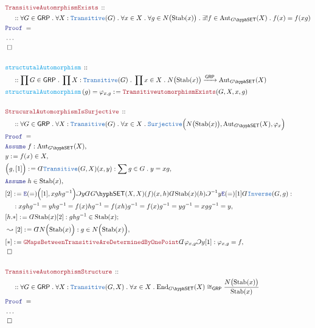 \documentclass[12pt]{scrartcl}
\newcommand{\TYPE}[1]{\textcolor{NavyBlue}{\mathtt{#1}}}
\newcommand{\FUNC}[1]{\textcolor{Cerulean}{\mathtt{#1}}}
\newcommand{\LOGIC}[1]{\textcolor{Blue}{\mathtt{#1}}}
\newcommand{\THM}[1]{\textcolor{Maroon}{\mathtt{#1}}}
\renewcommand{\.}{\; . \;}
\newcommand{\de}{: \kern 0.1pc =}
\newcommand{\Act}[1]{\left( #1 \right)}
\newcommand{\Theorem}[2]{& \THM{#1} \, :: \, #2 \\ & \Proof = \\ }
\newcommand{\DeclareFunc}[2]{& \FUNC{#1} \, :: \, #2 \\}
\newcommand{\DefineNamedFunc}[4]{&  \FUNC{#1}\Act{#2} = #3 \de #4 \\}
\newcommand{\NewLine}{\\ & \kern 1pc}
\newcommand{\Page}[1]{ \begin{align*} #1 \end{align*}   }
\newcommand{ \bd }{ \ByDef }
\newcommand{\NoProof}{ & \ldots \\ \EndProof}
\newcommand{\Elim}{\LOGIC{E}}
\newcommand{\End}{\mathrm{End}}
\newcommand{\Aut}{\mathrm{Aut}}
\newcommand{\Arrow}{\xrightarrow}
\newcommand{\Say}[3]{& #1 \de #2 : #3, \\}
\newcommand{\SayIn}[3]{& #1 \de #2 \in #3, \\}
\newcommand{\Conclude}[3]{& #1 \de #2 : #3; \\}
\newcommand{\Derive}[3]{& \leadsto #1 \de #2 : #3, \\}
\newcommand{\Assume}[2]{& \LOGIC{Assume} \; #1 : #2, \\}
\newcommand{\AssumeIn}[2]{& \LOGIC{Assume} \; #1 \in #2, \\}
\newcommand{\QED}{\; \square}
\newcommand{\EndProof}{& \QED \\}
\newcommand{\ByDef}{\rotatebox[origin=c]{-180}{$D$}}%
\newcommand{\ByConstr}{\rotatebox[origin=c]{-180}{$C$}}%
\newcommand{\Proof}{\LOGIC{Proof} \; }
\newcommand{\SET}{\mathsf{SET}}
\newcommand{\Stab}{\mathrm{Stab}}
\newcommand{\GRP}{\mathsf{GRP}}
\begin{document}
\Page{
	\Theorem{TransitiveAutomrphismExists}
	{
		\NewLine ::
		\forall G \in \GRP \. 
		\forall X : \TYPE{Transitive}(G) \.
		\forall x \in X \. 
		\forall g \in N\big( \Stab(x) \big) \.
		\exists! f \in \Aut_{G\hyph \SET}(X) \. 
		f(x) = f(xg)
	}\NoProof
	\\
	\DeclareFunc{structutalAutomorphism}
	{
		\NewLine ::
		\prod G \in \GRP \.
		\prod X : \TYPE{Transitive}(G) \.
		\prod x \in X \.
		N\big( \Stab(x) \big) \Arrow{\GRP} \Aut_{G\hyph \SET}(X) 
	}
	\DefineNamedFunc{structuralAutomorphism}{g}{\varphi_{x,g}}
	{
		\THM{TransitiveutomorphismExists}(G,X,x,g)
	}
	\\
	\Theorem{StrucuralAutomorphismIsSurjective}
	{
		\NewLine ::  
		\forall G \in \GRP \. 
		\forall X : \TYPE{Transitive}(G) \.
		\forall x \in X \. 
		\TYPE{Surjective}\Big( N\big( \Stab(x) \big), \Aut_{G\hyph \SET}(X), \varphi_x \Big)
	}
	\Assume{f}{\Aut_{G\hyph\SET}(X)}
	\SayIn{y}{f(x)}{X}
	\Say{\Big(g,[1]\Big)}{\bd \TYPE{Transitive}(G,X)(x,y)}
	{
		\sum g \in G \. y = xg
	}
	\AssumeIn{h}{\Stab(x)}
	\Say{[2]}
	{
		\Elim(=)\Big( [1], x g h g^{-1} \Big)
		\ByConstr y
		\bd G\hyph\SET(X,X)(f)(x,h)
		\bd \Stab(x)(h) 
		\ByConstr^{-1} y
		\Elim(=)[1]
		\bd \TYPE{Inverse}(G,g)
	}
	{
		\NewLine :
		x g h g^{-1} = 
		y h g^{-1}  =
		f(x) h g^{-1} =
		f(xh) g^{-1} = 
		f(x) g^{-1} =
		y g^{-1} =
		x gg^{-1} =
		y
	}
	\Conclude{[h.*]}{\bd \Stab(x) [2]}{ ghg^{-1} \in \Stab(x)  }
	\Derive{[2]}{\bd N\Big( \Stab(x) \Big)}{g \in N\Big( \Stab(x) \Big)}
	\Say{[*]}{\THM{GMapsBetweenTransitiveAreDeterminedByOnePoint}\bd \varphi_{x,g}\ByConstr y [1]}
	{
		\varphi_{x,g} = f
	}
	\EndProof
	\\
	\Theorem{TransitiveAutomorphismStructure}
	{
		\NewLine :: 
		\forall G \in \GRP \. 
		\forall X : \TYPE{Transitive}(G,X) \.
		\forall x \in X \.  
		\End_{G\hyph\SET}(X) \cong_\GRP \frac{N\big(\Stab(x)\big)}{\Stab(x)}
	}
	\NoProof
}
\newpage
\end{document}
